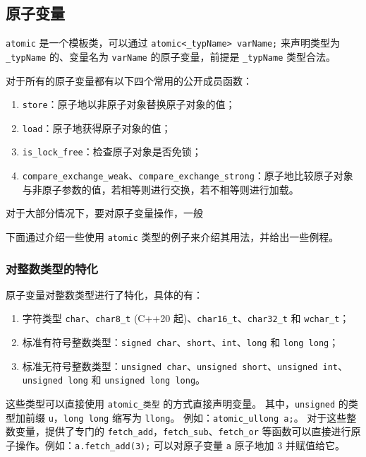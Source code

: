 \subsection{原子变量}
\verb`atomic` 是一个模板类，可以通过 \verb`atomic<_typName> varName;` 来声明类型为 \verb`_typName` 的、变量名为 \verb`varName` 的原子变量，前提是 \verb`_typName` 类型合法。

对于所有的原子变量都有以下四个常用的公开成员函数：
\begin{enumerate}
\item \verb`store`：原子地以非原子对象替换原子对象的值；
\item \verb`load`：原子地获得原子对象的值；
\item \verb`is_lock_free`：检查原子对象是否免锁；
\item \verb`compare_exchange_weak`、\verb`compare_exchange_strong`：原子地比较原子对象与非原子参数的值，若相等则进行交换，若不相等则进行加载。
\end{enumerate}

对于大部分情况下，要对原子变量操作，一般

下面通过介绍一些使用 \verb`atomic` 类型的例子来介绍其用法，并给出一些例程。

\subsubsection{对整数类型的特化}
原子变量对整数类型进行了特化，具体的有：
\begin{enumerate}
\item 字符类型 \verb`char`、\verb`char8_t` (C++20 起)、\verb`char16_t`、\verb`char32_t` 和 \verb`wchar_t`；
\item 标准有符号整数类型：\verb`signed char`、\verb`short`、\verb`int`、\verb`long` 和 \verb`long long`；
\item 标准无符号整数类型：\verb`unsigned char`、\verb`unsigned short`、\verb`unsigned int`、\verb`unsigned long` 和 \verb`unsigned long long`。
\end{enumerate}
这些类型可以直接使用 \verb`atomic_类型` 的方式直接声明变量。
其中，\verb`unsigned` 的类型加前缀 \verb`u`，\verb`long long` 缩写为 \verb`llong`。
例如：\verb`atomic_ullong a;`。
对于这些整数变量，提供了专门的 \verb`fetch_add`，\verb`fetch_sub`、\verb`fetch_or` 等函数可以直接进行原子操作。例如：\verb`a.fetch_add(3);` 可以对原子变量 \verb`a` 原子地加 $3$ 并赋值给它。

